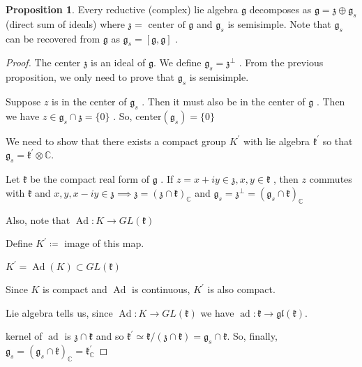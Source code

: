 \documentclass{article}
\theoremstyle{definition}
\newtheorem{proposition}{Proposition}
\newcommand{\ad}{\operatorname{ad}}
\newcommand{\Ad}{\operatorname{Ad}}
\begin{document}
\begin{proposition}
    Every reductive (complex) lie algebra \(\mathfrak{g} \) decomposes as \(\mathfrak{g} =\mathfrak{z} \oplus \mathfrak{g}_{s} \) (direct sum of ideals) where \(\mathfrak{z} =\text{ center of } \mathfrak{g} \) and \(\mathfrak{g} _{s} \) is semisimple. Note that \(\mathfrak{g} _{s} \) can be recovered from \(\mathfrak{g} \) as \(\mathfrak{g} _{s} =[\mathfrak{g} ,\mathfrak{g} ]\) .
\end{proposition}

\begin{proof}
    The center \(\mathfrak{z} \) is an ideal of \(\mathfrak{g}\). We define \(\mathfrak{g} _{s} =\mathfrak{z} ^{\perp} \) . From the previous proposition, we only need to prove that \(\mathfrak{g} _{s} \) is semisimple.

    Suppose \(z\) is in the center of \(\mathfrak{g} _{s} \) . Then it must also be in the center of \(\mathfrak{g} \) . Then we have \(z\in \mathfrak{g} _{s} \cap \mathfrak{z} =\{0\}\) . So, \(\text{center}(\mathfrak{g}_{s})=\{0\} \)
    
    We need to show that there exists a compact group \(K^{\prime} \) with lie algebra \(\mathfrak{k}^{\prime} \) so that \(\mathfrak{g} _{s} =\mathfrak{k}^{\prime} \otimes \mathbb{C} \).

    Let \(\mathfrak{k} \) be the compact real form of \(\mathfrak{g} \) . If \(z=x+iy\in \mathfrak{z} ,x,y\in \mathfrak{k} \) , then \(z\) commutes with \(\mathfrak{k} \) and \(x,y,x-iy\in \mathfrak{z} \implies \mathfrak{z} =(\mathfrak{z} \cap \mathfrak{k} )_\mathbb{C}\) and \(\mathfrak{g} _{s} =\mathfrak{z} ^{\perp} =(\mathfrak{g} _{s} \cap \mathfrak{k} )_\mathbb{C} \) 

    Also, note that \(\Ad:K \to GL(\mathfrak{k} )\) 

    Define \(K^{\prime} \coloneqq\) image of this map.
    
    \(K^{\prime} =\Ad(K)\subset GL(\mathfrak{k})\) 

    Since \(K\) is compact and \(\Ad\) is continuous, \(K^{\prime} \) is also compact.

    Lie algebra tells us, since \(\Ad:K \to GL(\mathfrak{k} )\) we have \(\ad:\mathfrak{k} \to \mathfrak{gl} (\mathfrak{k} )\).

    kernel of \(\ad\) is \(\mathfrak{z} \cap \mathfrak{k} \) and so \(\mathfrak{k}^{\prime} \simeq \mathfrak{k}/(\mathfrak{z}\cap \mathfrak{k} )=\mathfrak{g} _{s} \cap \mathfrak{k} \). So, finally, \(\mathfrak{g} _{s} =(\mathfrak{g}_s\cap \mathfrak{k} )_\mathbb{C} =\mathfrak{k}^{\prime} _\mathbb{C} \)  

\end{proof}
\end{document}
